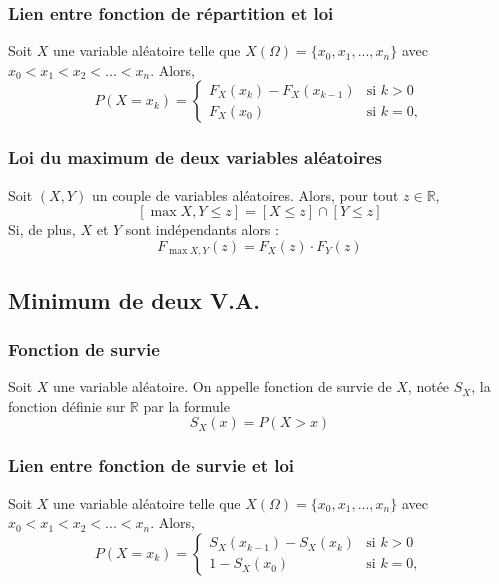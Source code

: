         \subsubsection{Lien entre fonction de répartition et loi}
            Soit $X$ une variable aléatoire telle que $X(\Omega) = \{x_0, x_1, ..., x_n\}$ avec 
            $x_0 < x_1 < x_2 < ... < x_n$. Alors, 
            \[
                P(X = x_k) = \begin{cases}
                F_X(x_k) - F_X(x_{k-1}) & \text{si } k > 0\\
                F_X(x_0)  & \text{si } k = 0,
                \end{cases}
            \]

        \subsubsection{Loi du maximum de deux variables aléatoires}
            Soit $(X, Y)$ un couple de variables aléatoires. Alors, pour tout $z \in \mathbb{R}$,
            \[
                [\max{X,Y} \leq z] = [X \leq z] \cap [Y \leq z] 
            \]
            Si, de plus, $X$ et $Y$ sont indépendants alors :
            \[
                F_{\max{X,Y}}(z) = F_X(z) \cdot F_Y(z) 
            \]
    
    \subsection{Minimum de deux V.A.}

        \subsubsection{Fonction de survie}
            Soit $X$ une variable aléatoire. On appelle fonction de survie de $X$,
            notée $S_X$, la fonction définie sur $\mathbb{R}$ par la formule
            \[
                S_X(x) = P(X > x)
            \]  

        \subsubsection{Lien entre fonction de survie et loi}
            Soit $X$ une variable aléatoire telle que $X(\Omega) = \{x_0, x_1, ..., x_n\}$ avec 
            $x_0 < x_1 < x_2 < ... < x_n$. Alors, 
            \[
                P(X = x_k) = \begin{cases}
                S_X(x_{k-1}) - S_X(x_k) & \text{si } k > 0\\
                1 - S_X(x_0)  & \text{si } k = 0,
                \end{cases}
            \]

